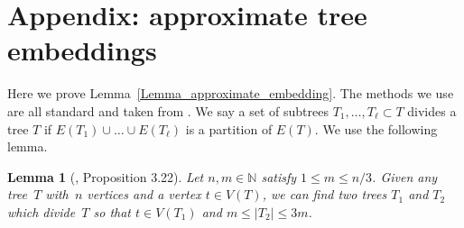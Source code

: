 \documentclass[a4paper,11pt,hidelinks]{amsart}
\newtheorem{lemma}[theorem]{Lemma}
\theoremstyle{definition}
\begin{document}



\newpage

\section{Appendix: approximate tree embeddings}
Here we prove Lemma~\ref{Lemma_approximate_embedding}. The methods we use are all standard and taken from \cite{approximateringel, ringel}. 
We say a set of subtrees $T_1,\ldots, T_\ell\subset T$ divides a tree $T$ if $E(T_1)\cup\ldots \cup E(T_\ell)$ is a partition of $E(T)$. We use the following lemma.
\begin{lemma}[\cite{randomspanningtree}, Proposition 3.22]\label{Lemma_littletree} Let $n,m\in \mathbb N$ satisfy $1\leq m\leq n/3$. Given any tree~$T$ with~$n$ vertices and a vertex $t\in V(T)$, we can find two trees $T_1$ and $T_2$ which divide~$T$ so that $t\in V(T_1)$ and $m\leq |T_2|\leq 3m$.
\end{lemma}
\end{document}
